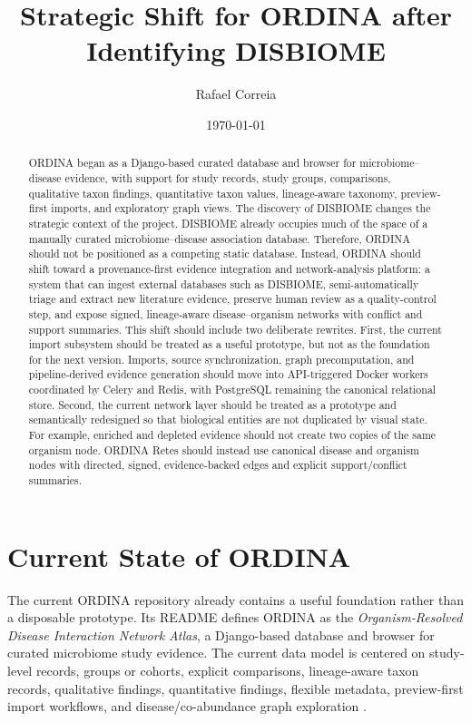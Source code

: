 \documentclass[11pt,a4paper]{article}
\title{Strategic Shift for ORDINA after Identifying DISBIOME}
\author{Rafael Correia}
\date{\today}
\begin{document}
\maketitle

\begin{abstract}
ORDINA began as a Django-based curated database and browser for microbiome--disease evidence, with support for study records, study groups, comparisons, qualitative taxon findings, quantitative taxon values, lineage-aware taxonomy, preview-first imports, and exploratory graph views. The discovery of DISBIOME changes the strategic context of the project. DISBIOME already occupies much of the space of a manually curated microbiome--disease association database. Therefore, ORDINA should not be positioned as a competing static database. Instead, ORDINA should shift toward a provenance-first evidence integration and network-analysis platform: a system that can ingest external databases such as DISBIOME, semi-automatically triage and extract new literature evidence, preserve human review as a quality-control step, and expose signed, lineage-aware disease--organism networks with conflict and support summaries. This shift should include two deliberate rewrites. First, the current import subsystem should be treated as a useful prototype, but not as the foundation for the next version. Imports, source synchronization, graph precomputation, and pipeline-derived evidence generation should move into API-triggered Docker workers coordinated by Celery and Redis, with PostgreSQL remaining the canonical relational store. Second, the current network layer should be treated as a prototype and semantically redesigned so that biological entities are not duplicated by visual state. For example, enriched and depleted evidence should not create two copies of the same organism node. ORDINA Retes should instead use canonical disease and organism nodes with directed, signed, evidence-backed edges and explicit support/conflict summaries.
\end{abstract}

\section{Current State of ORDINA}

The current ORDINA repository already contains a useful foundation rather than a disposable prototype. Its README defines ORDINA as the \emph{Organism-Resolved Disease Interaction Network Atlas}, a Django-based database and browser for curated microbiome study evidence. The current data model is centered on study-level records, groups or cohorts, explicit comparisons, lineage-aware taxon records, qualitative findings, quantitative findings, flexible metadata, preview-first import workflows, and disease/co-abundance graph exploration \cite{ordina-readme}.
\end{document}
